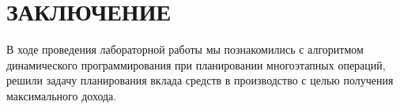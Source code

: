 \section*{ЗАКЛЮЧЕНИЕ}

В ходе проведения лабораторной работы мы познакомились с алгоритмом динамического программирования при планировании многоэтапных операций, решили задачу планирования вклада средств в производство с целью получения максимального дохода.

\newpage